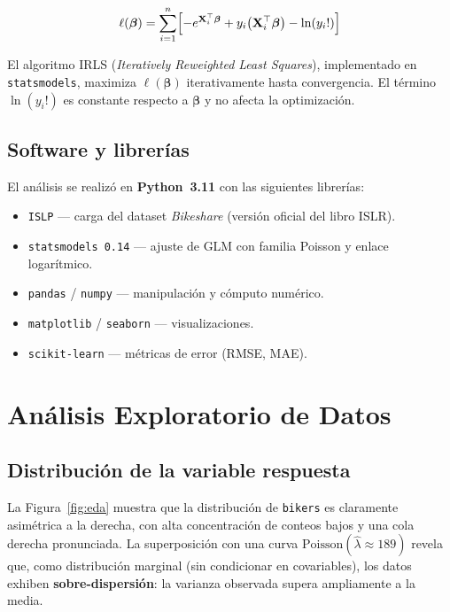 \documentclass[12pt, a4paper]{article}
\begin{document}
	\begin{equation}
		\ell(\boldsymbol{\beta}) = \sum_{i=1}^{n}
		\Bigl[-e^{\mathbf{X}_i^{\top}\boldsymbol{\beta}}
		+ y_i\bigl(\mathbf{X}_i^{\top}\boldsymbol{\beta}\bigr)
		- \ln(y_i!)\Bigr]
		\label{eq:loglik}
	\end{equation}
	
	El algoritmo IRLS (\textit{Iteratively Reweighted Least Squares}), implementado en
	\texttt{statsmodels}, maximiza $\ell(\boldsymbol{\beta})$ iterativamente hasta
	convergencia. El t\'ermino $\ln(y_i!)$ es constante respecto a $\boldsymbol{\beta}$
	y no afecta la optimizaci\'on.
	
	\subsection{Software y librer\'ias}
	
	El an\'alisis se realiz\'o en \textbf{Python~3.11} con las siguientes librer\'ias:
	
	\begin{itemize}[noitemsep]
		\item \texttt{ISLP} --- carga del dataset \textit{Bikeshare} (versi\'on oficial del libro ISLR).
		\item \texttt{statsmodels 0.14} --- ajuste de GLM con familia Poisson y enlace logar\'itmico.
		\item \texttt{pandas} / \texttt{numpy} --- manipulaci\'on y c\'omputo num\'erico.
		\item \texttt{matplotlib} / \texttt{seaborn} --- visualizaciones.
		\item \texttt{scikit-learn} --- m\'etricas de error (RMSE, MAE).
	\end{itemize}
	
	\section{An\'alisis Exploratorio de Datos}
	
	\subsection{Distribuci\'on de la variable respuesta}
	
	La Figura~\ref{fig:eda} muestra que la distribuci\'on de \texttt{bikers} es claramente
	asim\'etrica a la derecha, con alta concentraci\'on de conteos bajos y una cola
	derecha pronunciada. La superposici\'on con una curva $\text{Poisson}(\hat{\lambda}
	\approx 189)$ revela que, como distribuci\'on marginal (sin condicionar en
	covariables), los datos exhiben \textbf{sobre-dispersi\'on}: la varianza observada
	supera ampliamente a la media.
	
\end{document}
